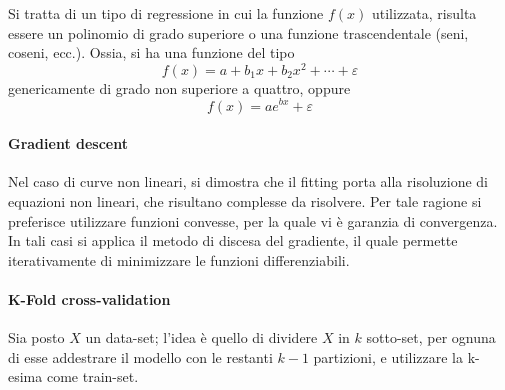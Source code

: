 \documentclass{subfiles}
\begin{document}
Si tratta di un tipo di regressione in cui la funzione \(f(x)\) utilizzata,
risulta essere un polinomio di grado superiore o una funzione trascendentale (seni, coseni, ecc.).
Ossia, si ha una funzione del tipo
\[
    f(x) = a + b_{1}x + b_{2}x^{2} + \cdots + \varepsilon
\]
genericamente di grado non superiore a quattro, oppure
\[
    f(x) = ae^{bx} + \varepsilon
\]
\paragraph*{Gradient descent}
Nel caso di curve non lineari, si dimostra che il fitting porta alla risoluzione di equazioni non lineari, che risultano complesse da risolvere.
Per tale ragione si preferisce utilizzare funzioni convesse, per la quale vi è garanzia di convergenza.
In tali casi si applica il metodo di discesa del gradiente, il quale permette iterativamente di minimizzare le funzioni differenziabili.

\paragraph*{K-Fold cross-validation}
Sia posto \(X\) un data-set; l'idea è quello di dividere \(X\) in \(k\) sotto-set,
per ognuna di esse addestrare il modello con le restanti \(k - 1\) partizioni,
e utilizzare la k-esima come train-set.
\end{document}
